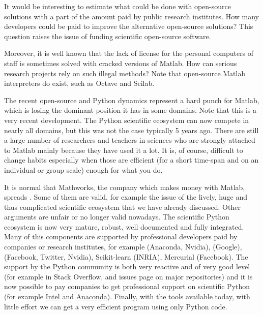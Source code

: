 It would be interesting to estimate what could be done with open-source
solutions with a part of the amount paid by public research institutes. How
many developers could be paid to improve the alternative open-source solutions?
%
This question raises the issue of funding scientific open-source software.

Moreover, it is well known that the lack of license for the personal computers
of staff is sometimes solved with cracked versions of Matlab. How can serious
research projects rely on such illegal methods?
%
Note that open-source Matlab interpreters do exist, such as Octave and Scilab.
%
%

The recent open-source and Python dynamics represent a hard punch for Matlab,
which is losing the dominant position it has in some domains.
%
Note that this is a very recent development. The Python scientific ecosystem can
now compete in nearly all domains, but this was not the case typically 5 years
ago.
%
There are still a large number of researchers and teachers in sciences who are
strongly attached to Matlab mainly because they have used it a lot.
%
It is, of course, difficult to change habits especially when those are efficient
(for a short time-span and on an individual or group scale) enough for what you
do.

It is normal that Mathworks, the company which makes money with Matlab, spreads
.  Some of them are valid, for
example the issue of the lively, huge and thus complicated scientific ecosystem
that we have already discussed.  Other arguments are unfair or no longer valid
nowadays.
%
The scientific Python ecosystem is now very mature, robust, well documented and
fully integrated.  Many of this components are supported by professional
developers paid by companies or research institutes, for example 
(Anaconda, Nvidia),  (Google),  (Facebook, Twitter,
Nvidia), Scikit-learn (INRIA), Mercurial (Facebook).
%
The support by the Python community is both very reactive and of very good
level (for example in Stack Overflow, and issues page on major repositories)
and it is now possible to pay companies to get professional support on
scientific Python (for example
\href{https://software.intel.com/en-us/distribution-for-python/get-help}{Intel}
and \href{https://www.anaconda.com/enterprise/}{Anaconda}).
%
Finally, with the tools available today, with little effort we can get a very
efficient program using only Python code.

